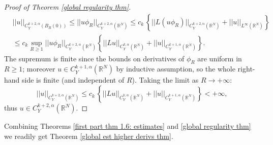 \documentclass{article}
\numberwithin{equation}{section}
\begin{document}
\begin{proof}[Proof of Theorem \ref{global regularity thm}]
    \begin{align*}
        & ||u||_{C^{k+2,\alpha}_Y(B_R(0))} \leq ||u \phi_R||_{C^{k+2,\alpha}_Y(\mathbb{R}^N)} \leq c_k \, \left\{ ||L(u \phi_R)||_{C^{k+2,\alpha}_Y(\mathbb{R}^N)} + ||u||_{L^{\infty}(\mathbb{R}^N)} 
        \right\} \\
        & \leq c_k \sup_{R \geq 1} ||u \phi_R||_{C^{k+2,\alpha}_Y(\mathbb{R}^N)} \left\{ ||Lu||_{C^{k,\alpha}_Y(\mathbb{R}^N)} + ||u||_{C^{k+1, \alpha}_Y(\mathbb{R}^N)} \right\}.
    \end{align*}
    The supremum is finite since the bounds on derivatives of $\phi_R$ are uniform in $R \geq 1$; moreover $u \in C^{k+1,\alpha}_Y(\mathbb{R}^N)$ by inductive assumption, so the whole right-hand side is finite (and independent of $R$). Taking the limit as $R \to +\infty$:
    \begin{equation*}
        ||u||_{C^{k+2,\alpha}_Y(\mathbb{R}^N)} \leq c_k \, \left\{ ||Lu||_{C^{k,\alpha}_Y(\mathbb{R}^N)} + ||u||_{C^{k+1,\alpha}_Y(\mathbb{R}^N)} \right\}<+\infty,
    \end{equation*}
    thus $u \in C^{k+2,\alpha}_Y(\mathbb{R}^N)$.
\end{proof}

\vspace{2mm}

\hspace{-7mm} Combining Theorems \ref{first part thm 1.6: estimates} and \ref{global regularity thm} we readily get Theorem \ref{global est higher derivs thm}.

\vspace{5mm}
\end{document}
